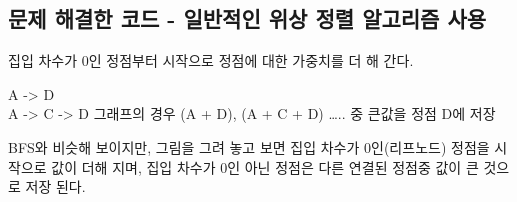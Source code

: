 \documentclass[11pt]{article}
\begin{document}
    \hypertarget{uxbb38uxc81c-uxd574uxacb0uxd55c-uxcf54uxb4dc---uxc77cuxbc18uxc801uxc778-uxc704uxc0c1-uxc815uxb82c-uxc54cuxace0uxb9acuxc998-uxc0acuxc6a9}{%
\subsection{문제 해결한 코드 - 일반적인 위상 정렬 알고리즘
사용}\label{uxbb38uxc81c-uxd574uxacb0uxd55c-uxcf54uxb4dc---uxc77cuxbc18uxc801uxc778-uxc704uxc0c1-uxc815uxb82c-uxc54cuxace0uxb9acuxc998-uxc0acuxc6a9}}

집입 차수가 0인 정점부터 시작으로 정점에 대한 가중치를 더 해 간다.

A -\textgreater{} D\\
A -\textgreater{} C -\textgreater{} D 그래프의 경우 (A + D), (A + C + D)
\ldots{}.. 중 큰값을 정점 D에 저장

BFS와 비슷해 보이지만, 그림을 그려 놓고 보면 집입 차수가 0인(리프노드)
정점을 시작으로 값이 더해 지며, 집입 차수가 0인 아닌 정점은 다른 연결된
정점중 값이 큰 것으로 저장 된다.
\end{document}
